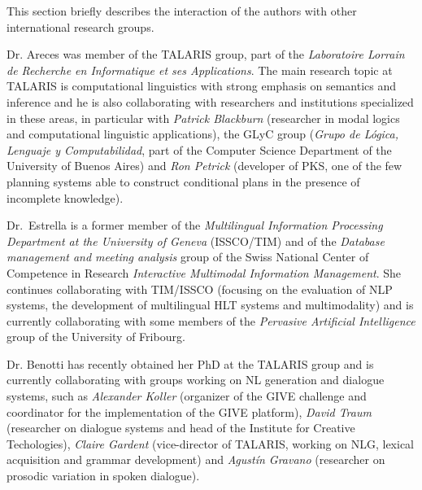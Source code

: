 This section briefly describes the interaction of the authors with other international research groups.

Dr. Areces was member of the TALARIS group, part of the \emph{Laboratoire Lorrain de Recherche en Informatique et ses Applications}. The main research topic at TALARIS is computational linguistics with strong emphasis on semantics and inference and he is also collaborating with researchers and institutions specialized in these areas, in particular with \textit{Patrick Blackburn} (researcher in modal logics and computational linguistic applications), the GLyC group (\textit{Grupo de L\'ogica, Lenguaje y Computabilidad}, part of the Computer Science Department of the University of Buenos Aires) and \textit{Ron Petrick} (developer of PKS, one of the few planning systems able to construct conditional plans in the presence of incomplete knowledge).


Dr.\ Estrella is a former member of the \textit{Multilingual Information Processing Department
at the University of Geneva} (ISSCO/TIM) and of the \emph{Database management and meeting
analysis} group of the Swiss National Center of Competence in Research \emph{Interactive Multimodal Information Management}. She continues collaborating with TIM/ISSCO (focusing on the evaluation of NLP systems, the development of multilingual HLT systems and multimodality) and is currently collaborating with some members of the \textit{Pervasive Artificial Intelligence} group of the University of Fribourg.

Dr. Benotti has recently obtained her PhD at the TALARIS group and is currently collaborating with groups working on NL generation and dialogue systems, such as \textit{Alexander Koller} (organizer of the GIVE challenge and coordinator for the implementation of the GIVE platform), \textit{David Traum} (researcher on dialogue systems and head of the Institute for Creative Techologies), \textit{Claire Gardent} (vice-director of TALARIS, working on NLG, lexical acquisition and grammar development) and \textit{Agust\'in Gravano} (researcher on prosodic variation in spoken dialogue).
